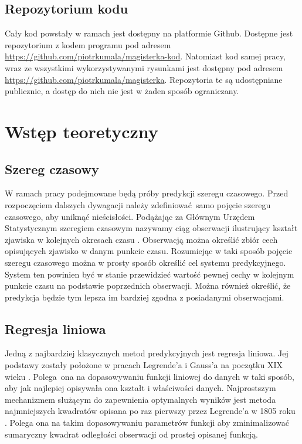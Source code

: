 \documentclass[10pt,a4paper]{article}
\begin{document}
\subsection{Repozytorium kodu}
Cały kod powstały w ramach jest dostępny na platformie Github. Dostępne jest repozytorium z kodem programu pod adresem \url{https://github.com/piotrkumala/magisterka-kod}. Natomiast kod samej pracy, wraz ze wszystkimi wykorzystywanymi rysunkami jest dostępny pod adresem \url{https://github.com/piotrkumala/magisterka}. Repozytoria te są udostępniane publicznie, a dostęp do nich nie jest w żaden sposób ograniczany. 

\newpage
\section{Wstęp teoretyczny}
\subsection{Szereg czasowy}
\label{subsection:introduction:timeSeries}
W ramach pracy podejmowane będą próby predykcji szeregu czasowego. Przed rozpoczęciem dalszych dywagacji należy zdefiniować samo pojęcie szeregu czasowego, aby uniknąć nieścisłości. Podążając za Głównym Urzędem Statystycznym szeregiem czasowym nazywamy ciąg obserwacji ilustrujący kształt zjawiska w kolejnych okresach czasu \cite{GUS}. Obserwacją można określić zbiór cech opisujących zjawisko w danym punkcie czasu. Rozumiejąc w taki sposób pojęcie szeregu czasowego można w prosty sposób określić cel systemu predykcyjnego. System ten powinien być w stanie przewidzieć wartość pewnej cechy w kolejnym punkcie czasu na podstawie poprzednich obserwacji. Można również określić, że predykcja będzie tym lepsza im bardziej zgodna z posiadanymi obserwacjami. 

\subsection{Regresja liniowa}
\label{subsection:introduction:linearRegression}
Jedną z najbardziej klasycznych metod predykcyjnych jest regresja liniowa. Jej podstawy zostały położone w pracach Legrende'a i Gauss'a na początku XIX wieku \cite{seal1967studies}. Polega ona na dopasowywaniu funkcji liniowej do danych w taki sposób, aby jak najlepiej opisywała ona kształt i właściwości danych. Najprostszym mechanizmem służącym do zapewnienia optymalnych wyników jest metoda najmniejszych kwadratów opisana po raz pierwszy przez Legrende'a w 1805 roku \cite{legendre1806nouvelles}. Polega ona na takim dopasowywaniu parametrów funkcji aby zminimalizować sumaryczny kwadrat odległości obserwacji od prostej opisanej funkcją. 
\end{document}
